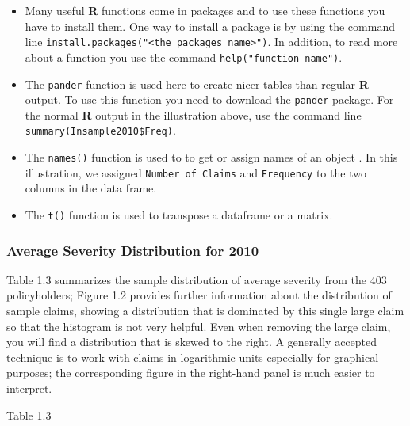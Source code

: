 \documentclass[]{book}
\newenvironment{Shaded}{\begin{snugshade}}{\end{snugshade}}
\newcommand{\KeywordTok}[1]{\textcolor[rgb]{0.13,0.29,0.53}{\textbf{#1}}}
\newcommand{\DecValTok}[1]{\textcolor[rgb]{0.00,0.00,0.81}{#1}}
\newcommand{\StringTok}[1]{\textcolor[rgb]{0.31,0.60,0.02}{#1}}
\newcommand{\OperatorTok}[1]{\textcolor[rgb]{0.81,0.36,0.00}{\textbf{#1}}}
\newcommand{\NormalTok}[1]{#1}
\theoremstyle{definition}
\theoremstyle{definition}
\theoremstyle{definition}
\theoremstyle{remark}
\begin{document}
\begin{itemize}
\item
  Many useful \textbf{R} functions come in packages and to use these
  functions you have to install them. One way to install a package is by
  using the command line
  \texttt{install.packages("\textless{}the\ package\textquotesingle{}s\ name\textgreater{}")}.
  In addition, to read more about a function you use the command
  \texttt{help("function\ name")}.
\item
  The \texttt{pander} function is used here to create nicer tables than
  regular \textbf{R} output. To use this function you need to download
  the \texttt{pander} package. For the normal \textbf{R} output in the
  illustration above, use the command line
  \texttt{summary(Insample2010\$Freq)}.
\item
  The \texttt{names()} function is used to to get or assign names of an
  object . In this illustration, we assigned \texttt{Number\ of\ Claims}
  and \texttt{Frequency} to the two columns in the data frame.
\item
  The \texttt{t()} function is used to transpose a dataframe or a
  matrix.
\end{itemize}

\subsubsection{Average Severity Distribution for
2010}\label{average-severity-distribution-for-2010}

Table 1.3 summarizes the sample distribution of average severity from
the 403 policyholders; Figure 1.2 provides further information about the
distribution of sample claims, showing a distribution that is dominated
by this single large claim so that the histogram is not very helpful.
Even when removing the large claim, you will find a distribution that is
skewed to the right. A generally accepted technique is to work with
claims in logarithmic units especially for graphical purposes; the
corresponding figure in the right-hand panel is much easier to
interpret.

Table 1.3

\begin{Shaded}
\end{Shaded}
\end{document}
